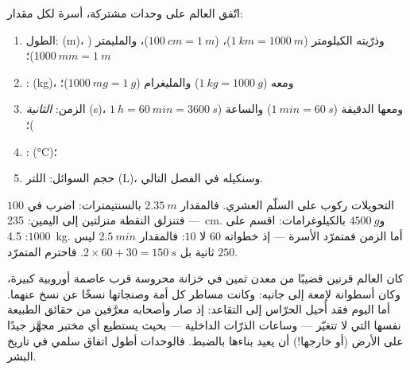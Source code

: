 \begin{definition}\label{def:g6:measurement-in-science:units}
اتّفق العالم على وحدات مشتركة، أسرة لكل مقدار:
\begin{enumerate}
  \item الطول: \emph{} (\unit{m})، وذرّيته الكيلومتر
        ($\qty{1}{km} = \qty{1000}{m}$)، 
        ($\qty{100}{cm} = \qty{1}{m}$)، والمليمتر
        ($\qty{1000}{mm} = \qty{1}{m}$)؛
  \item {}: \emph{} (\unit{kg})، ومعه 
        ($\qty{1}{kg} = \qty{1000}{g}$) والمليغرام
        ($\qty{1000}{mg} = \qty{1}{g}$)؛
  \item الزمن: \emph{الثانية} (\unit{s})، ومعها الدقيقة
        ($\qty{1}{min} = \qty{60}{s}$) والساعة
        ($\qty{1}{h} = \qty{60}{min} = \qty{3600}{s}$)؛
  \item {}:  (\unit{\celsius})؛
  \item حجم السوائل: اللتر (\unit{L})، وسنكيله في الفصل
        التالي.
\end{enumerate}
\end{definition}

\begin{example}\label{ex:g6:measurement-in-science:convert}
التحويلات ركوب على السلّم العشري.
فالمقدار $\qty{2.35}{m}$ بالسنتيمترات: اضرب في $100$ --- فتنزلق النقطة
منزلتين إلى اليمين: \qty{235}{cm}. و$\qty{4500}{g}$
بالكيلوغرامات: اقسم على $1000$: \qty{4.5}{kg}. أما الزمن فمتمرّد
الأسرة --- إذ خطواته $60$ لا $10$: فالمقدار $\qty{2.5}{min}$ ليس
$250$ ثانية بل $2 \times 60 + 30 = \qty{150}{s}$. فاحترم
المتمرّد.
\end{example}

\begin{remark}\label{rem:g6:measurement-in-science:guard}
كان  العالم قرنين قضيبًا من معدن ثمين في خزانة محروسة قرب
عاصمة أوروبية كبيرة، وكان  أسطوانة لامعة إلى جانبه:
وكانت مساطر كل أمة وصنجاتها نسخًا عن نسخ عنهما. أما اليوم فقد
أُحيل الحرّاس إلى التقاعد: إذ صار  وأصحابه معرَّفين من
حقائق الطبيعة نفسها التي لا تتغيّر ---  وساعات الذرّات
الداخلية --- بحيث يستطيع أي مختبر مجهَّز جيدًا على الأرض (أو
خارجها!) أن يعيد بناءها بالضبط. فالوحدات أطول اتفاق سلمي في
تاريخ البشر.
\end{remark}

